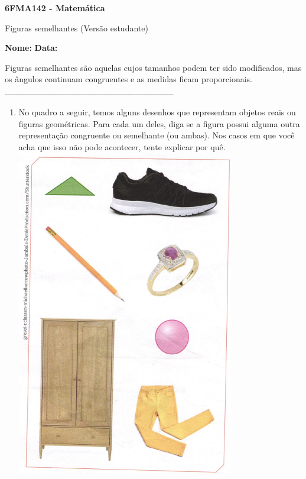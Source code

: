 \documentclass[a4paper,14pt]{article}
\begin{document}
	
	\noindent\textbf{6FMA142 - Matemática} 
	
	\begin{center}Figuras semelhantes (Versão estudante)
	\end{center}
	
	\noindent\textbf{Nome:} \underline{\hspace{10cm}}
	\noindent\textbf{Data:} \underline{\hspace{4cm}}
	
	
	\begin{multicols}{2}
	    \noindent Figuras semelhantes são aquelas cujos tamanhos podem ter sido modificados, mas os ângulos continuam congruentes e as medidas ficam proporcionais.
		\noindent\textsubscript{--------------------------------------------------------------------------}
		\begin{enumerate} 
			\item No quadro a seguir, temos alguns desenhos que representam objetos reais ou figuras geométricas. Para cada um deles, diga se a figura possui alguma outra representação congruente ou semelhante (ou ambas). Nos casos em que você acha que isso não pode acontecer, tente explicar por quê. \\
			\includegraphics[width=1\linewidth]{6FMA142_imagens/imagem1}

\end{enumerate}
\end{multicols}
\end{document}
